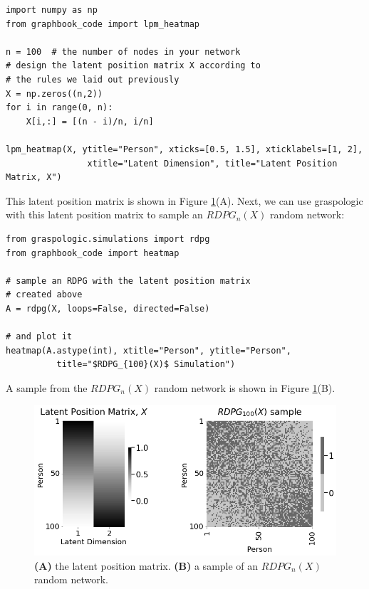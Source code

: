 \begin{lstlisting}[style=python]
import numpy as np
from graphbook_code import lpm_heatmap

n = 100  # the number of nodes in your network
# design the latent position matrix X according to 
# the rules we laid out previously
X = np.zeros((n,2))
for i in range(0, n):
    X[i,:] = [(n - i)/n, i/n]

lpm_heatmap(X, ytitle="Person", xticks=[0.5, 1.5], xticklabels=[1, 2],
                xtitle="Latent Dimension", title="Latent Position Matrix, X")
\end{lstlisting}

This latent position matrix is shown in Figure \ref{fig:ch5:rdpg}(A). Next, we can use graspologic with this latent position matrix to sample an $RDPG_n(X)$ random network:

\begin{lstlisting}[style=python]
from graspologic.simulations import rdpg
from graphbook_code import heatmap

# sample an RDPG with the latent position matrix
# created above
A = rdpg(X, loops=False, directed=False)

# and plot it
heatmap(A.astype(int), xtitle="Person", ytitle="Person",
          title="$RDPG_{100}(X)$ Simulation")
\end{lstlisting}

A sample from the $RDPG_n(X)$ random network is shown in Figure \ref{fig:ch5:rdpg}(B).

\begin{figure}[h]
    \centering
    \includegraphics[width=\linewidth]{representations/ch5/Images/rdpg.png}
    \caption[Visualizing the Random Dot Product Graph]{\textbf{(A)} the latent position matrix. \textbf{(B)} a sample of an $RDPG_n(X)$ random network.}
    \label{fig:ch5:rdpg}
\end{figure}


